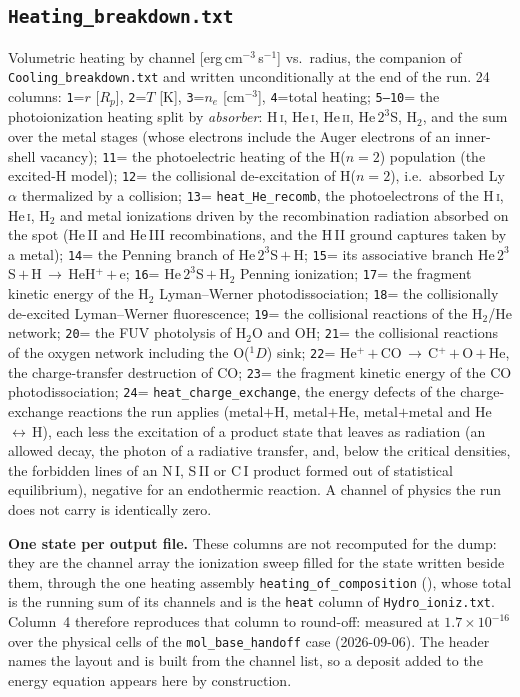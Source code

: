 \documentclass[english,a4paper]{my_memo}
\newcommand{\rp}{\ensuremath{R_p}}   %
\begin{document}
\subsection{\texttt{Heating\_breakdown.txt}}
Volumetric heating by channel [erg\,cm$^{-3}$\,s$^{-1}$] vs.\ radius, the
companion of \texttt{Cooling\_breakdown.txt} and written unconditionally at the
end of the run. 24 columns: \texttt{1}=$r$ [\rp], \texttt{2}=$T$ [K],
\texttt{3}=$n_e$ [cm$^{-3}$], \texttt{4}=total heating; \texttt{5--10}= the
photoionization heating split by \emph{absorber}: H\,\textsc{i},
He\,\textsc{i}, He\,\textsc{ii}, He\,$2^3$S, H$_2$, and the sum over the metal
stages (whose electrons include the Auger electrons of an inner-shell
vacancy); \texttt{11}= the photoelectric heating of the H($n{=}2$) population
(the excited-H model); \texttt{12}= the collisional de-excitation of
H($n{=}2$), i.e.\ absorbed Ly$\alpha$ thermalized by a collision;
\texttt{13}= \texttt{heat\_He\_recomb}, the photoelectrons of the H\,\textsc{i},
He\,\textsc{i}, H$_2$ and metal ionizations driven by the recombination
radiation absorbed on the spot (He\,II and He\,III recombinations, and the
H\,II ground captures taken by a metal); \texttt{14}= the Penning branch of
He\,$2^3$S\,$+$\,H; \texttt{15}= its associative branch
He\,$2^3$S\,$+$\,H\,$\to$\,HeH$^+$\,$+$\,e; \texttt{16}=
He\,$2^3$S\,$+$\,H$_2$ Penning ionization; \texttt{17}= the fragment kinetic
energy of the H$_2$ Lyman--Werner photodissociation; \texttt{18}= the
collisionally de-excited Lyman--Werner fluorescence; \texttt{19}= the
collisional reactions of the H$_2$/He network; \texttt{20}= the FUV photolysis
of H$_2$O and OH; \texttt{21}= the collisional reactions of the oxygen network
including the O($^1D$) sink; \texttt{22}= He$^+$\,$+$\,CO\,$\to$\,C$^+$\,$+$\,O\,$+$\,He,
the charge-transfer destruction of CO; \texttt{23}= the fragment kinetic energy
of the CO photodissociation; \texttt{24}= \texttt{heat\_charge\_exchange}, the
energy defects of the charge-exchange reactions the run applies (metal$+$H,
metal$+$He, metal$+$metal and He\,$\leftrightarrow$\,H), each less the
excitation of a product state that leaves as radiation (an allowed decay, the
photon of a radiative transfer, and, below the critical densities, the
forbidden lines of an N\,I, S\,II or C\,I product formed out of statistical
equilibrium), negative for an endothermic reaction. A channel of physics the
run does not carry is identically zero.

\textbf{One state per output file.} These columns are not recomputed for the
dump: they are the channel array the ionization sweep filled for the state
written beside them, through the one heating assembly
\texttt{heating\_of\_composition}
(), whose total is the running
sum of its channels and is the \texttt{heat} column of
\texttt{Hydro\_ioniz.txt}. Column~4 therefore reproduces that column to
round-off: measured at $1.7\times10^{-16}$ over the physical cells of the
\texttt{mol\_base\_handoff} case (2026-09-06). The header names the layout and
is built from the channel list, so a deposit added to the energy equation
appears here by construction.
\end{document}
